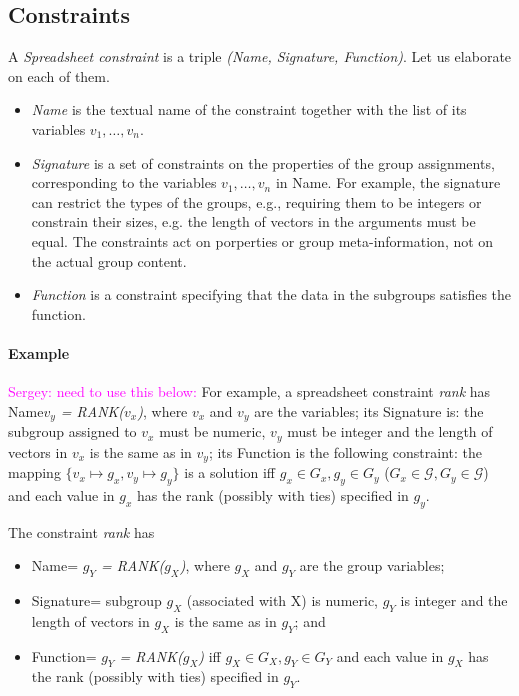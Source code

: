 \documentclass{ecai}
\newcommand{\sergey}[1]{\textcolor{magenta}{{\sc Sergey:} #1}\xspace}
\newcommand{\CName}{Name\xspace}
\newcommand{\CSignature}{Signature\xspace}
\newcommand{\CFunction}{Function\xspace}
\newcommand{\groups}{\ensuremath{\mathcal{G}}\xspace}
\begin{document}
\subsection{Constraints}
A \textit{Spreadsheet constraint} is a triple \textit{(\CName, \CSignature, \CFunction)}.
Let us elaborate on each of them. 
\begin{itemize}
\item
\textit{\CName} is the textual name of the constraint together with the list of its variables $v_1,\dots,v_n$.
\item
  \textit{\CSignature} is a set of constraints on the properties of the group assignments, corresponding to the variables $v_1,\dots,v_n$ in \CName.
  For example, the signature can restrict the types of the groups, e.g., requiring them to be integers or constrain their sizes, e.g. the length of vectors in the arguments must be equal.
  The constraints act on porperties or group meta-information, not on the actual group content. 
\item \textit{\CFunction} is a constraint specifying that the data in the subgroups satisfies the function.
  \end{itemize}

\paragraph{Example}
\sergey{need to use this below:}
  For example, a spreadsheet constraint \textit{rank} has \CName \textit{$v_y$ = RANK($v_x$)}, where $v_x$ and $v_y$ are the variables; its \CSignature is: the subgroup assigned to $v_x$ must be numeric, $v_y$ must be integer and the length of vectors in $v_x$ is the same as in $v_y$; its \CFunction is the following constraint: the mapping $\{ v_x \mapsto g_x, v_y \mapsto g_y \}$ is a solution iff $g_x \in G_x, g_y \in G_y$ ($G_x \in \groups, G_y \in \groups$) and each value in $g_x$ has the rank (possibly with ties) specified in $g_y$. 

The constraint \textit{rank} has
\begin{itemize}
\item \CName = \textit{$g_Y$ = RANK($g_X$)}, where $g_X$ and $g_Y$ are the group variables;
\item \CSignature = subgroup $g_X$ (associated with X) is numeric, $g_Y$ is integer and the length of vectors in $g_X$ is the same as in $g_Y$; and
\item
\CFunction = \textit{$g_Y$ = RANK($g_X$)} iff $g_X \in G_X, g_Y \in G_Y$ and each value in $g_X$ has the rank (possibly with ties) specified in $g_Y$.
\end{itemize}
\end{document}
